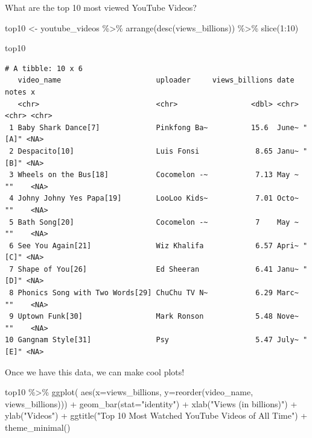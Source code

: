 \documentclass[
  letterpaper,
  DIV=11,
  numbers=noendperiod]{scrartcl}
\newenvironment{Shaded}{\begin{snugshade}}{\end{snugshade}}
\newcommand{\AttributeTok}[1]{\textcolor[rgb]{0.40,0.45,0.13}{#1}}
\newcommand{\DecValTok}[1]{\textcolor[rgb]{0.68,0.00,0.00}{#1}}
\newcommand{\FunctionTok}[1]{\textcolor[rgb]{0.28,0.35,0.67}{#1}}
\newcommand{\NormalTok}[1]{\textcolor[rgb]{0.00,0.23,0.31}{#1}}
\newcommand{\OtherTok}[1]{\textcolor[rgb]{0.00,0.23,0.31}{#1}}
\newcommand{\SpecialCharTok}[1]{\textcolor[rgb]{0.37,0.37,0.37}{#1}}
\newcommand{\StringTok}[1]{\textcolor[rgb]{0.13,0.47,0.30}{#1}}
\begin{document}
What are the top 10 most viewed YouTube Videos?

\begin{Shaded}
\begin{Highlighting}[]
\NormalTok{top10 }\OtherTok{\textless{}{-}}\NormalTok{ youtube\_videos }\SpecialCharTok{\%\textgreater{}\%}
  \FunctionTok{arrange}\NormalTok{(}\FunctionTok{desc}\NormalTok{(views\_billions)) }\SpecialCharTok{\%\textgreater{}\%}
  \FunctionTok{slice}\NormalTok{(}\DecValTok{1}\SpecialCharTok{:}\DecValTok{10}\NormalTok{)}

\NormalTok{top10}
\end{Highlighting}
\end{Shaded}

\begin{verbatim}
# A tibble: 10 x 6
   video_name                      uploader     views_billions date  notes x    
   <chr>                           <chr>                 <dbl> <chr> <chr> <chr>
 1 Baby Shark Dance[7]             Pinkfong Ba~          15.6  June~ "[A]" <NA> 
 2 Despacito[10]                   Luis Fonsi             8.65 Janu~ "[B]" <NA> 
 3 Wheels on the Bus[18]           Cocomelon -~           7.13 May ~ ""    <NA> 
 4 Johny Johny Yes Papa[19]        LooLoo Kids~           7.01 Octo~ ""    <NA> 
 5 Bath Song[20]                   Cocomelon -~           7    May ~ ""    <NA> 
 6 See You Again[21]               Wiz Khalifa            6.57 Apri~ "[C]" <NA> 
 7 Shape of You[26]                Ed Sheeran             6.41 Janu~ "[D]" <NA> 
 8 Phonics Song with Two Words[29] ChuChu TV N~           6.29 Marc~ ""    <NA> 
 9 Uptown Funk[30]                 Mark Ronson            5.48 Nove~ ""    <NA> 
10 Gangnam Style[31]               Psy                    5.47 July~ "[E]" <NA> 
\end{verbatim}

Once we have this data, we can make cool plots!

\begin{Shaded}
\begin{Highlighting}[]
\NormalTok{top10 }\SpecialCharTok{\%\textgreater{}\%} 
  \FunctionTok{ggplot}\NormalTok{( }\FunctionTok{aes}\NormalTok{(}\AttributeTok{x=}\NormalTok{views\_billions, }\AttributeTok{y=}\FunctionTok{reorder}\NormalTok{(video\_name, views\_billions))) }\SpecialCharTok{+}
    \FunctionTok{geom\_bar}\NormalTok{(}\AttributeTok{stat=}\StringTok{"identity"}\NormalTok{) }\SpecialCharTok{+}
    \FunctionTok{xlab}\NormalTok{(}\StringTok{"Views (in billions)"}\NormalTok{) }\SpecialCharTok{+}
    \FunctionTok{ylab}\NormalTok{(}\StringTok{"Videos"}\NormalTok{) }\SpecialCharTok{+}
    \FunctionTok{ggtitle}\NormalTok{(}\StringTok{"Top 10 Most Watched YouTube Videos of All Time"}\NormalTok{) }\SpecialCharTok{+}
    \FunctionTok{theme\_minimal}\NormalTok{()}
\end{Highlighting}
\end{Shaded}
\end{document}
